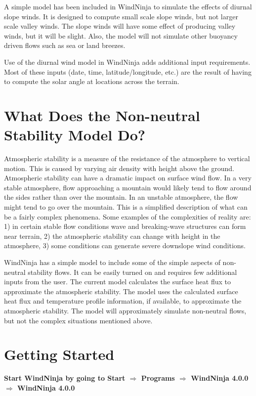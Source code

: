 \documentclass[12pt]{article}
\newcommand\vn{4.0.0}
\begin{document}
A simple model has been included in WindNinja to simulate the effects of diurnal slope winds.  
It is designed to compute small scale slope winds, but not larger scale valley winds.  
The slope winds will have some effect of producing valley winds, but it will be slight.  
Also, the model will not simulate other buoyancy driven flows such as sea or land breezes.

Use of the diurnal wind model in WindNinja adds additional input requirements.  
Most of these inputs (date, time, latitude/longitude, etc.) are the result of having to compute the solar angle at locations across the terrain.

\section*{What Does the Non-neutral Stability Model Do?}

Atmospheric stability is a measure of the resistance of the atmosphere to vertical motion.  
This is caused by varying air density with height above the ground.  
Atmospheric stability can have a dramatic impact on surface wind flow.  
In a very stable atmosphere, flow approaching a mountain would likely tend to flow around the sides rather than over the mountain. 
In an unstable atmosphere, the flow might tend to go over the mountain.  This is a simplified description of what can be a fairly complex phenomena. 
Some examples of the complexities of reality are:  1) in certain stable flow conditions wave and breaking-wave structures can form near terrain, 2) the atmospheric stability can change with height in the atmosphere, 3) some conditions can generate severe downslope wind conditions.

WindNinja has a simple model to include some of the simple aspects of non-neutral stability flows.  
It can be easily turned on and requires few additional inputs from the user.  
The current model calculates the surface heat flux to approximate the atmospheric stability.  
The model uses the calculated surface heat flux and temperature profile information, if available, to approximate the atmospheric stability.
The model will approximately simulate non-neutral flows, but not the complex situations mentioned above.

\section{Getting Started}

\textbf{\color{red}Start WindNinja by going to Start $\Rightarrow$ Programs $\Rightarrow$ WindNinja \vn\ $\Rightarrow$ WindNinja \vn\ }
\end{document}
